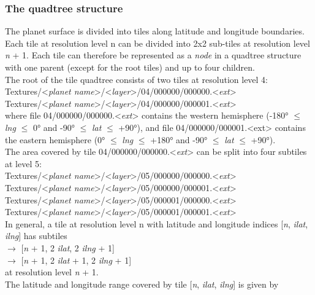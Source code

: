 \documentclass[Orbiter Developer Manual.tex]{subfiles}
\begin{document}
\subsubsection{The quadtree structure}
\label{sssec:quadtree_struct}
The planet surface is divided into tiles along latitude and longitude boundaries. Each tile at resolution level n can be divided into 2x2 sub-tiles at resolution level \textit{n} + 1. Each tile can therefore be represented as a \textit{node} in a quadtree structure with one parent (except for the root tiles) and up to four children.\\
The root of the tile quadtree consists of two tiles at resolution level 4:\\
\indent Textures/<\textit{planet name}>/<\textit{layer}>/04/000000/000000.<\textit{ext}>\\
\indent Textures/<\textit{planet name}>/<\textit{layer}>/04/000000/000001.<\textit{ext}>\\
where file 04/000000/000000.<\textit{ext}> contains the western hemisphere (-180° $\leq$ \textit{lng} $\leq$ 0° and -90° $\leq$ \textit{lat} $\leq$ +90°), and file 04/000000/000001.<ext> contains the eastern hemisphere (0° $\leq$ \textit{lng} $\leq$ +180° and -90° $\leq$ \textit{lat} $\leq$ +90°).\\
The area covered by tile 04/000000/000000.<\textit{ext}> can be split into four subtiles at level 5:\\
\indent Textures/<\textit{planet name}>/<\textit{layer}>/05/000000/000000.<\textit{ext}>\\
\indent Textures/<\textit{planet name}>/<\textit{layer}>/05/000000/000001.<\textit{ext}>\\
\indent Textures/<\textit{planet name}>/<\textit{layer}>/05/000001/000000.<\textit{ext}>\\
\indent Textures/<\textit{planet name}>/<\textit{layer}>/05/000001/000001.<\textit{ext}>\\
In general, a tile at resolution level n with latitude and longitude indices [\textit{n}, \textit{ilat}, \textit{ilng}] has subtiles\\
 $\rightarrow$ [\textit{n} + 1, 2 \textit{ilat}, 2 \textit{ilng} + 1]\\
 $\rightarrow$ [\textit{n} + 1, 2 \textit{ilat} + 1, 2 \textit{ilng} + 1]\\
at resolution level \textit{n} + 1.\\
The latitude and longitude range covered by tile [\textit{n}, \textit{ilat}, \textit{ilng}] is given by
\end{document}
